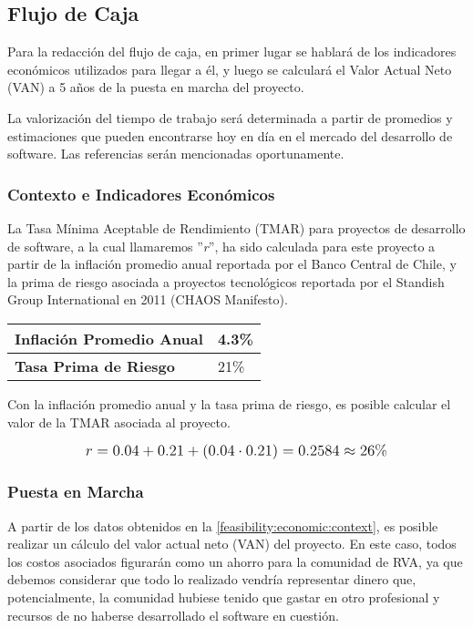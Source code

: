 \subsection{Flujo de Caja}
Para la redacción del flujo de caja, en primer lugar se hablará de los indicadores económicos utilizados para llegar a él, y luego se calculará el Valor Actual Neto (VAN) a 5 años de la puesta en marcha del proyecto.

La valorización del tiempo de trabajo será determinada a partir de promedios y estimaciones que pueden encontrarse hoy en día en el mercado del desarrollo de software. Las referencias serán mencionadas oportunamente.

\subsubsection{Contexto e Indicadores Económicos}
\label{feasibility:economic:context}
La Tasa Mínima Aceptable de Rendimiento (TMAR) para proyectos de desarrollo de software, a la cual llamaremos ''\textit{r}'', ha sido calculada para este proyecto a partir de la inflación promedio anual reportada por el Banco Central de Chile, y la prima de riesgo asociada a proyectos tecnológicos reportada por el Standish Group International en 2011 (CHAOS Manifesto).

\begin{center}
	\begin{tabular}{ | p{7cm} | p{5cm}|}
		\hline
		{\textbf{Inflación Promedio Anual}} & 4.3\%  \\ \hline
		{\textbf{Tasa Prima de Riesgo}} & 21\% \\ \hline
	\end{tabular}

  \label{table:indicators}
\end{center}

Con la inflación promedio anual y la tasa prima de riesgo, es posible calcular el valor de la TMAR asociada al proyecto.

\[
\mathlarger{
  r = 0.04+0.21+(0.04\cdot0.21) = 0.2584 \approx 26\%
}
\]

\subsubsection{Puesta en Marcha}
\label{feasibility:economic:startup}
A partir de los datos obtenidos en la \autoref{feasibility:economic:context}, es posible realizar un cálculo del valor actual neto (VAN) del proyecto. En este caso, todos los costos asociados figurarán como un ahorro para la comunidad de RVA, ya que debemos considerar que todo lo realizado vendría representar dinero que, potencialmente, la comunidad hubiese tenido que gastar en otro profesional y recursos de no haberse desarrollado el software en cuestión.

